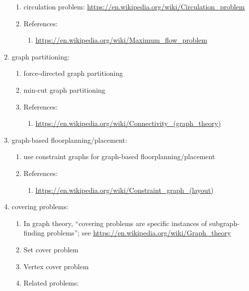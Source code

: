 \begin{enumerate}
\begin{enumerate}
	\item circulation problem: \url{https://en.wikipedia.org/wiki/Circulation_problem}
	\item References: \vspace{-0.2cm}
		\begin{enumerate} \itemsep -2pt
		\item \url{https://en.wikipedia.org/wiki/Maximum_flow_problem}
		\end{enumerate}
	\end{enumerate}
\item graph partitioning: \vspace{-0.3cm}
	\begin{enumerate} \itemsep -2pt
	\item force-directed graph partitioning
	\item min-cut graph partitioning
	\item References: \vspace{-0.2cm}
		\begin{enumerate} \itemsep -2pt
		\item \url{https://en.wikipedia.org/wiki/Connectivity_(graph_theory)}
		\end{enumerate}
	\end{enumerate}
\item graph-based floorplanning/placement: \vspace{-0.3cm}
	\begin{enumerate} \itemsep -2pt
	\item use constraint graphs for graph-based floorplanning/placement
	\item References: \vspace{-0.2cm}
		\begin{enumerate} \itemsep -2pt
		\item \url{https://en.wikipedia.org/wiki/Constraint_graph_(layout)}
		\end{enumerate}
	\end{enumerate}
\item covering problems: \vspace{-0.3cm}
	\begin{enumerate} \itemsep -2pt
	\item In graph theory, ``covering problems are specific instances of subgraph-finding problems''; see \url{https://en.wikipedia.org/wiki/Graph_theory}
	\item Set cover problem
	\item Vertex cover problem
	\item Related problems: \vspace{-0.2cm}

\end{enumerate}
\end{enumerate}
